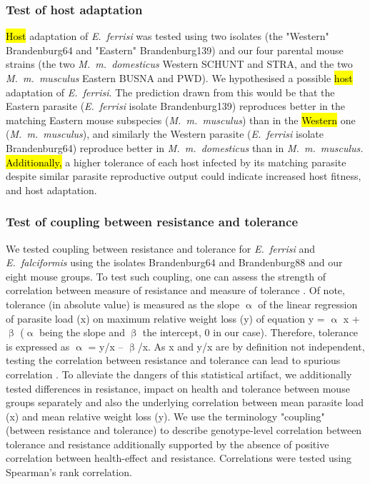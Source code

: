 \documentclass[12pt]{article}
\begin{document}
\subsubsection{Test of host adaptation}

\hl{Host} adaptation of \textit{E.~ferrisi} was tested using two isolates (the "Western" Brandenburg64 and "Eastern" Brandenburg139) and our four parental mouse strains (the two \textit{M.~m.~domesticus} Western SCHUNT and STRA, and the two \textit{M.~m.~musculus }Eastern BUSNA and PWD). We hypothesised a possible \hl{host} adaptation of \textit{E.~ferrisi}. The prediction drawn from this would be that the Eastern parasite (\textit{E.~ferrisi} isolate Brandenburg139) reproduces better in the matching Eastern mouse subspecies (\textit{M.~m.~musculus}) than in the \hl{Western} one (\textit{M.~m.~musculus}), and similarly the Western parasite (\textit{E.~ferrisi} isolate Brandenburg64) reproduce better in \textit{M.~m.~domesticus} than in \textit{M.~m.~musculus.} \hl{Additionally,} a higher tolerance of each host infected by its matching parasite despite similar parasite reproductive output could indicate increased host fitness, and host adaptation.\par

\subsubsection{Test of coupling between resistance and tolerance}

We tested coupling between resistance and tolerance for \textit{E.~ferrisi} and \textit{E.~falciformis }using the isolates Brandenburg64 and Brandenburg88 and our eight mouse groups. To test such coupling, one can assess the strength of correlation between measure of resistance and measure of tolerance \citep{raaberg_disentangling_2007}. Of note, tolerance (in absolute value) is measured as the slope $\upalpha$ of the linear regression of parasite load (x) on maximum relative weight loss (y) of equation y = $\upalpha$ x + $\upbeta$ ($\upalpha$ being the slope and $\upbeta$ the intercept, 0 in our case). Therefore, tolerance is expressed as $\upalpha$ = y/x – $\upbeta$/x. As x and y/x are by definition not independent, testing the correlation between resistance and tolerance can lead to spurious correlation \citep{Brett2004}. To alleviate the dangers of this statistical artifact, we additionally tested differences in resistance, impact on health and tolerance between mouse groups separately and also the underlying correlation between mean parasite load (x) and mean relative weight loss (y). We use the terminology "coupling" (between resistance and tolerance) to describe genotype-level correlation between tolerance and resistance additionally supported by the absence of positive correlation between health-effect and resistance. Correlations were tested using Spearman’s rank correlation.\par
\end{document}
